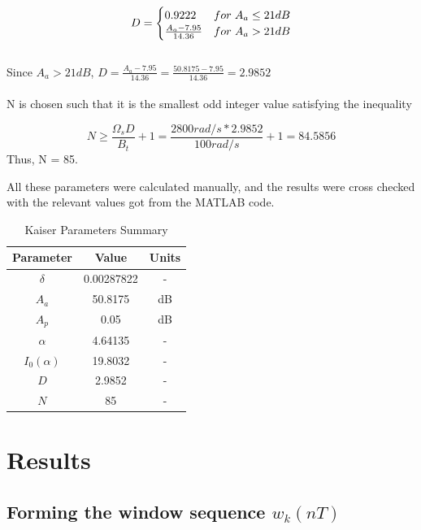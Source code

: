 \documentclass[11pt]{article}
\begin{document}
\[
    D = \begin{cases}
    0.9222 & for \hspace*{3pt} A_a \leq 21 dB \\
    \frac{A_a - 7.95}{14.36} & for \hspace*{3pt} A_a > 21 dB
   \end{cases}
   \]\\
{\color{ultramarine} Since $A_a > 21 dB$, $D =  \frac{A_a - 7.95}{14.36}= \frac{50.8175 - 7.95}{14.36} =    2.9852$}
\\
\\
N is chosen such that it is the smallest odd integer value satisfying the inequality 

{\color{ultramarine} $$N\geq\frac{\Omega_sD}{B_t}+1 = \frac{2800 rad/s * 2.9852}{100 rad/s}+1  = 84.5856$$}
Thus, N = 85.

All these parameters were calculated manually, and the results were cross checked with the relevant values got from the MATLAB code. 

\begin{center}
    \begin{table}[h]
    \centering
    \caption {Kaiser Parameters Summary}
    \begin{tabular}{@{}ccc@{}}
        \toprule
            {Parameter}  & {Value} & {Units}  \\
            \midrule
            $\delta$           & 0.00287822 & -  \\
            $A_a$              & 50.8175    & dB \\
            $A_p$              & 0.05       & dB \\
            $\alpha$           & 4.64135    & -  \\
            $I_0(\alpha)$      & 19.8032    & -  \\
            $D$                & 2.9852     & -  \\
            $N$                & 85         & -  \\
        \bottomrule
    \end{tabular}
    \end{table}
    \end{center}


\section{Results}
\subsection{Forming the window sequence $w_k(nT)$}
\end{document}
